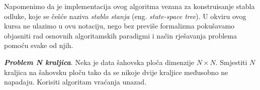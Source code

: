     Napomenimo da je implementacija ovog algoritma vezana za konstruisanje stabla odluke, koje se češće naziva \textit{stablo stanja} (eng. \textit{state-space tree}). U okviru ovog kursa ne ulazimo u ovu notaciju, nego bez previše formalizma pokušavamo objasniti rad osnovnih algoritamskih paradigmi i način rješavanja problema pomoću svake od njih.    
    
    
    \begin{example}
    	\textbf{\emph{Problem N kraljica}}.  Neka je data šahovska ploča dimenzije $N\times N$. Smjestiti $N $ kraljica na šahovsku ploču tako da se nikoje dvije kraljice međusobno ne napadaju.  Korisiti algoritam vraćanja unazad. 
    \end{example}


